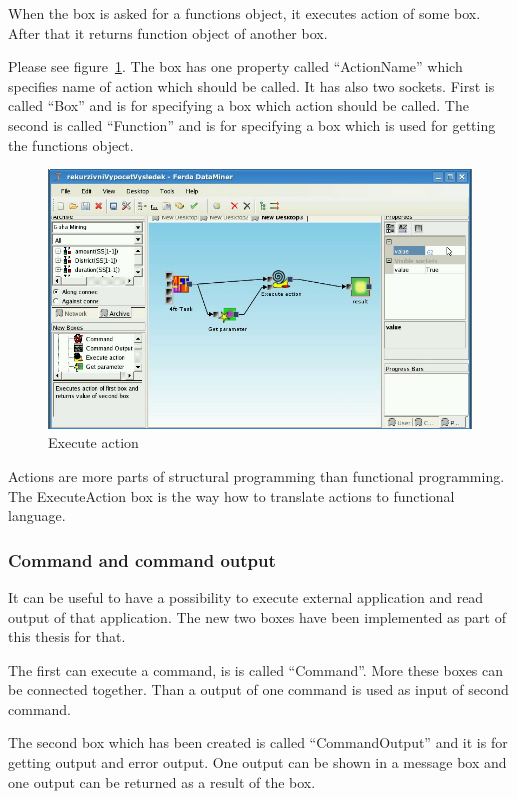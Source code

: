 \documentclass[a4paper,12pt]{book}
\begin{document}
When the box is asked for a functions object, it executes action of some box. After that it returns function object of another box.

Please see figure~\ref{fig:boxExecuteAction}. The box has one property called ``ActionName'' which specifies name of action which should be called. It has also two sockets. First is called ``Box'' and is for specifying a box which action should be called. The second is called ``Function'' and is for specifying a box which is used for getting the functions object.

\begin{figure}
	\includegraphics[width=1\textwidth]{executeAction2.png}
	\caption{Execute action}
	\label{fig:boxExecuteAction}
\end{figure}

Actions are more parts of structural programming than functional programming. The ExecuteAction box is the way how to translate actions to functional language. 

\subsubsection{Command and command output}
It can be useful to have a possibility to execute external application and read output of that application. The new two boxes have been implemented as part of this thesis for that.

The first can execute a command, is is called ``Command''. More these boxes can be connected together. Than a output of one command is used as input of second command.

The second box which has been created is called ``CommandOutput'' and it is for getting output and error output. One output can be shown in a message box and one output can be returned as a result of the box.
\end{document}
